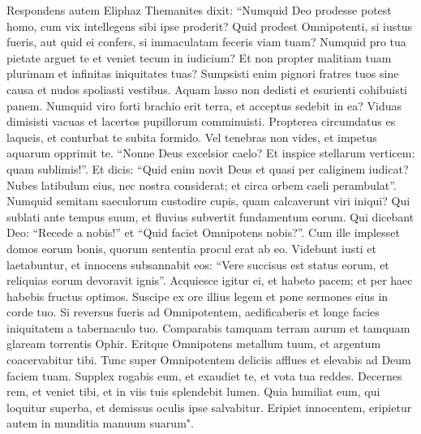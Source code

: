 \begin{biblechapter}  
\verse Respondens autem Eliphaz Themanites dixit: 
\verse “Numquid Deo prodesse potest homo, cum vix intellegens sibi ipse proderit? 
\verse Quid prodest Omnipotenti, si iustus fueris, aut quid ei confers, si immaculatam feceris viam tuam? 
\verse Numquid pro tua pietate arguet te et veniet tecum in iudicium? 
\verse Et non propter malitiam tuam plurimam et infinitas iniquitates tuas? 
\verse Sumpsisti enim pignori fratres tuos sine causa et nudos spoliasti vestibus. 
\verse Aquam lasso non dedisti et esurienti cohibuisti panem. 
\verse Numquid viro forti brachio erit terra, et acceptus sedebit in ea? 
\verse Viduas dimisisti vacuas et lacertos pupillorum comminuisti. 
\verse Propterea circumdatus es laqueis, et conturbat te subita formido. 
\verse Vel tenebras non vides, et impetus aquarum opprimit te. 
\verse “Nonne Deus excelsior caelo? Et inspice stellarum verticem: quam sublimis!”. 
\verse Et dicis: “Quid enim novit Deus et quasi per caliginem iudicat? 
\verse Nubes latibulum eius, nec nostra considerat; et circa orbem caeli perambulat”. 
\verse Numquid semitam saeculorum custodire cupis, quam calcaverunt viri iniqui? 
\verse Qui sublati ante tempus suum, et fluvius subvertit fundamentum eorum. 
\verse Qui dicebant Deo: “Recede a nobis!” et “Quid faciet Omnipotens nobis?”. 
\verse Cum ille implesset domos eorum bonis, quorum sententia procul erat ab eo. 
\verse Videbunt iusti et laetabuntur, et innocens subsannabit eos: 
\verse “Vere succisus est status eorum, et reliquias eorum devoravit ignis”. 
\verse Acquiesce igitur ei, et habeto pacem; et per haec habebis fructus optimos. 
\verse Suscipe ex ore illius legem et pone sermones eius in corde tuo. 
\verse Si reversus fueris ad Omnipotentem, aedificaberis et longe facies iniquitatem a tabernaculo tuo. 
\verse Comparabis tamquam terram aurum et tamquam glaream torrentis Ophir. 
\verse Eritque Omnipotens metallum tuum, et argentum coacervabitur tibi. 
\verse Tunc super Omnipotentem deliciis afflues et elevabis ad Deum faciem tuam. 
\verse Supplex rogabis eum, et exaudiet te, et vota tua reddes. 
\verse Decernes rem, et veniet tibi, et in viis tuis splendebit lumen. 
\verse Quia humiliat eum, qui loquitur superba, et demissus oculis ipse salvabitur. 
\verse Eripiet innocentem, eripietur autem in munditia manuum suarum". 
\end{biblechapter}


